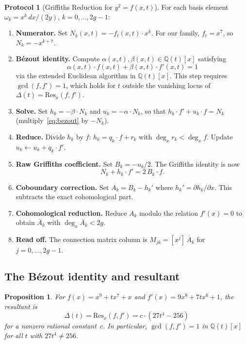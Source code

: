 \documentclass[11pt]{article}
\theoremstyle{plain}
\newtheorem{proposition}[theorem]{Proposition}
\theoremstyle{definition}
\newtheorem{protocol}[theorem]{Protocol}
\theoremstyle{remark}
\newcommand{\Q}{\mathbb{Q}}
\begin{document}
\begin{protocol}[Griffiths Reduction for $y^2 = f(x,t)$]\label{prot:griffiths}
For each basis element $\omega_k = x^k\, dx/(2y)$, $k = 0,\ldots,2g-1$:
\begin{enumerate}[nosep]
\item \textbf{Numerator.} Set $N_k(x,t) = -f_t(x,t) \cdot x^k$.
  For our family, $f_t = x^7$, so $N_k = -x^{k+7}$.
\item \textbf{B\'ezout identity.} Compute $\alpha(x,t), \beta(x,t)
  \in \Q(t)[x]$ satisfying
  \begin{equation}\label{eq:bezout}
    \alpha(x,t) \cdot f(x,t) + \beta(x,t) \cdot f'(x,t) = 1
  \end{equation}
  via the extended Euclidean algorithm in $\Q(t)[x]$.  This step
  requires $\gcd(f, f') = 1$, which holds for $t$ outside the
  vanishing locus of $\Delta(t) = \mathrm{Res}_x(f, f')$.
\item \textbf{Solve.} Set $h_k = -\beta \cdot N_k$ and
  $u_k = -\alpha \cdot N_k$, so that
  $h_k \cdot f' + u_k \cdot f = N_k$ (multiply~\eqref{eq:bezout}
  by $-N_k$).
\item \textbf{Reduce.} Divide $h_k$ by $f$:
  $h_k = q_k \cdot f + r_k$ with $\deg_x r_k < \deg_x f$.
  Update $u_k \leftarrow u_k + q_k \cdot f'$.
\item \textbf{Raw Griffiths coefficient.} Set $B_k = -u_k / 2$.
  The Griffiths identity is now
  \begin{equation}\label{eq:griffiths-id}
    N_k + h_k \cdot f' = 2\, B_k \cdot f.
  \end{equation}
\item \textbf{Coboundary correction.} Set $A_k = B_k - h_k'$
  where $h_k' = \partial h_k / \partial x$.  This subtracts the
  exact cohomological part.
\item \textbf{Cohomological reduction.} Reduce $A_k$ modulo the
  relation $f'(x) = 0$ to obtain $\overline{A}_k$ with
  $\deg_x \overline{A}_k < 2g$.
\item \textbf{Read off.} The connection matrix column is
  $M_{jk} = [x^j]\, \overline{A}_k$ for $j = 0,\ldots,2g-1$.
\end{enumerate}
\end{protocol}

\subsection{The B\'ezout identity and resultant}

\begin{proposition}\label{prop:bezout}
For $f(x) = x^9 + tx^7 + x$ and $f'(x) = 9x^8 + 7tx^6 + 1$, the
resultant is
\[
  \Delta(t) = \mathrm{Res}_x(f, f') = c \cdot (27t^4 - 256)
\]
for a nonzero rational constant~$c$.  In particular, $\gcd(f, f') = 1$
in $\Q(t)[x]$ for all $t$ with $27t^4 \ne 256$.
\end{proposition}
\end{document}
